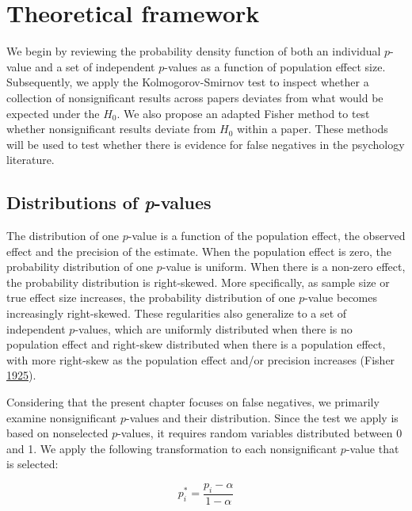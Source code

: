 \documentclass[a5paper]{book}
\begin{document}
\section{Theoretical framework}\label{theoretical-framework}

We begin by reviewing the probability density function of both an
individual \(p\)-value and a set of independent \(p\)-values as a
function of population effect size. Subsequently, we apply the
Kolmogorov-Smirnov test to inspect whether a collection of
nonsignificant results across papers deviates from what would be
expected under the \(H_0\). We also propose an adapted Fisher method to
test whether nonsignificant results deviate from \(H_0\) within a paper.
These methods will be used to test whether there is evidence for false
negatives in the psychology literature.

\subsection{\texorpdfstring{Distributions of
\emph{p}-values}{Distributions of p-values}}\label{distributions-of-p-values}

The distribution of one \(p\)-value is a function of the population
effect, the observed effect and the precision of the estimate. When the
population effect is zero, the probability distribution of one
\(p\)-value is uniform. When there is a non-zero effect, the probability
distribution is right-skewed. More specifically, as sample size or true
effect size increases, the probability distribution of one \(p\)-value
becomes increasingly right-skewed. These regularities also generalize to
a set of independent \(p\)-values, which are uniformly distributed when
there is no population effect and right-skew distributed when there is a
population effect, with more right-skew as the population effect and/or
precision increases (Fisher
\protect\hyperlink{ref-Fisher1925-jl}{1925}).

Considering that the present chapter focuses on false negatives, we
primarily examine nonsignificant \(p\)-values and their distribution.
Since the test we apply is based on nonselected \(p\)-values, it
requires random variables distributed between 0 and 1. We apply the
following transformation to each nonsignificant \(p\)-value that is
selected:

\begin{equation}
p^*_i=\frac{p_i-\alpha}{1-\alpha}
\label{eq:pistar}
\end{equation}
\end{document}
